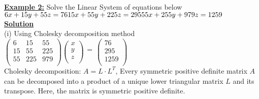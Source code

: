 \documentclass[12pt]{report}
\newcommand{\ubt}[1]{\textbf{\underline{#1}}}
\newcommand{\sps}{\\[0.2cm]}
\newcommand{\NI}{\noindent}
\newcommand{\dsp}{\displaystyle}
\begin{document}
	\NI \ubt{Example 2:} Solve the Linear System of equations below\sps
	$
		6x + 15y + 55z = 76\\
		15x + 55y + 225z = 295\\
		55x + 255y + 979z = 1259\\
	$\sps
	\ubt{Solution}\sps
	(i) Using Cholesky decomposition method\sps
	$\dsp
		\left(
			\begin{array}{ccc}
				6 & 15 & 55\\
				15 & 55 & 225\\
				55 & 225 & 979\\
			\end{array}
		\right)
		\left(
			\begin{array}{c}
				x\\y\\z\\
			\end{array}
		\right)
		\begin{array}{c}
			~\\=\\~\\
		\end{array}
		\left(
			\begin{array}{c}
				76\\295\\1259\\
			\end{array}
		\right)
	$\sps
	Cholesky decomposition: $A=L\cdot L^T$, Every symmetric positive definite matrix $A$ can be decomposed into a product of a unique lower triangular matrix $L$ and its transpose. Here, the matrix is symmetric positive definite.\sps
	
\end{document}
